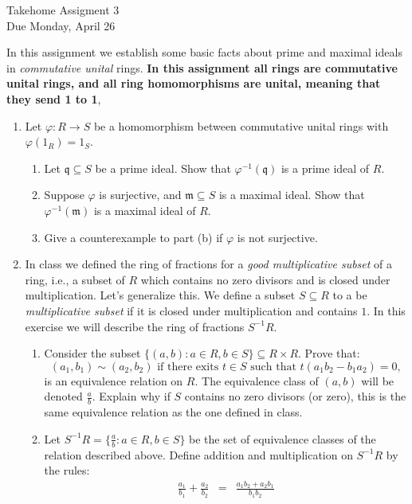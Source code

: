 \documentclass[11pt]{article}
\newcommand{\fm}{\mathfrak{m}}
\newcommand{\fq}{\mathfrak{q}}
\begin{document}
\begin{center}
  \Large {Takehome Assigment 3}\\
  \small {Due Monday, April 26}
\end{center}
In this assignment we establish some basic facts about prime and maximal ideals in \textit{commutative unital} rings.  \textbf{In this assignment all rings are commutative unital rings, and all ring homomorphisms are unital, meaning that they send 1 to 1},
\begin{enumerate}
  \item{
  Let $\varphi:R\to S$ be a homomorphism between commutative unital rings with $\varphi(1_R)=1_S$.
  \begin{enumerate}
    \item{
    Let $\fq\subseteq S$ be a prime ideal.  Show that $\varphi^{-1}(\fq)$ is a prime ideal of $R$.
    }
    \item{
    Suppose $\varphi$ is surjective, and $\fm\subseteq S$ is a maximal ideal.  Show that $\varphi^{-1}(\fm)$ is a maximal ideal of $R$.
    }
    \item{
    Give a counterexample to part (b) if $\varphi$ is not surjective.
    }
  \end{enumerate}
  }
  \item{
  In class we defined the ring of fractions for a \textit{good multiplicative subset} of a ring, i.e., a subset of $R$ which contains no zero divisors and is closed under multiplication.  Let's generalize this.  We define a subset $S\subseteq R$ to a be \textit{multiplicative subset} if it is closed under multiplication and contains $1$.  In this exercise we will describe the ring of fractions $S^{-1}R$.
  \begin{enumerate}
    \item{
    Consider the subset $\{(a,b):a\in R,b\in S\}\subseteq R\times R$.  Prove that:
    \[(a_1,b_1)\sim(a_2,b_2)\text{ if there exits }t\in S\text{ such that }t(a_1b_2-b_1a_2)=0,\]
    is an equivalence relation on $R$.  The equivalence class of $(a,b)$ will be denoted $\frac{a}{b}$.  Explain why if $S$ contains no zero divisors (or zero), this is the same equivalence relation as the one defined in class.
    }
    \item{
    Let $S^{-1}R = \{\frac{a}{b}:a\in R,b\in S\}$ be the set of equivalence classes of the relation described above.  Define addition and multiplication on $S^{-1}R$ by the rules:
    \begin{eqnarray*}
      \frac{a_1}{b_1}+\frac{a_2}{b_2} &=& \frac{a_1b_2+a_2b_1}{b_1b_2}\\

\end{eqnarray*}}
\end{enumerate}}
\end{enumerate}
\end{document}
